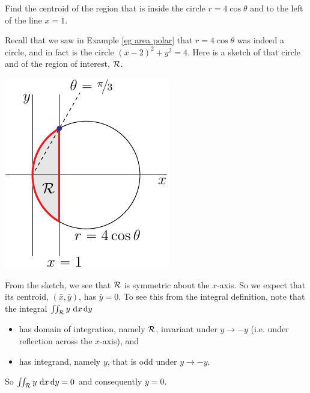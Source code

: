 \begin{eg}\label{eg cofm polar}
Find the centroid of the region that is inside the circle
$r=4\cos\theta$ and to the left of the line $x=1$.

\soln
Recall that we saw in Example \ref{eg area polar}
that $r=4\cos\theta$ was indeed a circle, and in fact is the 
circle $(x-2)^2+y^2=4$.
Here is a sketch of that circle and of the region of interest, $\mathcal{R}$.

\begin{efig}
\begin{center}
    \includegraphics{comPolarA.pdf}
\end{center}
\end{efig}\noindent
From the sketch, we see that $\mathcal{R}$
is symmetric about  the $x$-axis. So we expect that its centroid, 
$(\bar x,\bar y)$, has $\bar y=0$. To see this from the integral definition,
note that the integral $\iint_{\mathcal{R}} y\  \mathrm{d}x\,\mathrm{d}y$
\begin{itemize}\itemsep1pt \parskip0pt 
\item 
has domain of integration, namely $\mathcal{R}$,  invariant 
under $y\rightarrow -y$ (i.e. under reflection across the $x$-axis), and
\item 
has integrand, namely $y$, that is odd under $y\rightarrow -y$.
\end{itemize}
So $\iint_{\mathcal{R}} y\  \mathrm{d}x\,\mathrm{d}y=0$ and consequently $\bar y=0$.


\end{eg}
